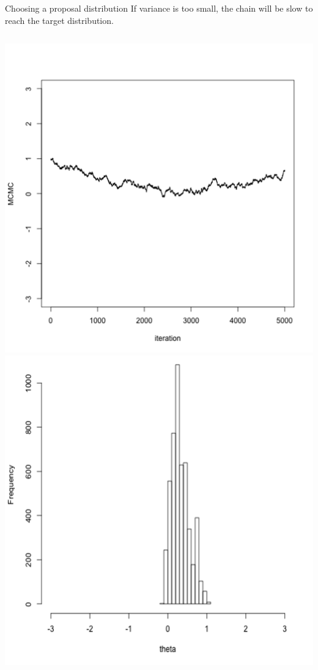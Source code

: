 \documentclass[compress]{beamer}
\begin{document}
\begin{frame}[label=sec-8-3]{Choosing a proposal distribution}
    If \alert {variance is too small}, the chain will be slow to reach the target distribution.
    \begin{columns}[c] 
    \includegraphics[width=0.8\linewidth]{Var1}
    \includegraphics[width=0.8\linewidth]{Trace1}
\end{columns}  
\end{frame}
\end{document}
